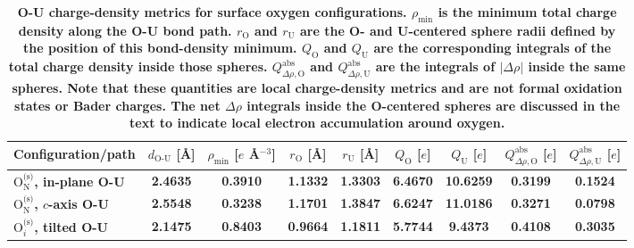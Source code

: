 \documentclass[preprint,12pt,sort&compress]{elsarticle}
\newcommand{\?}{\stackrel{?}{=}}
\providecommand{\DIFaddtex}[1]{{\bf #1}} %
\providecommand{\DIFaddFL}[1]{\DIFadd{#1}} %
\providecommand{\DIFadd}[1]{\texorpdfstring{\DIFaddtex{#1}}{#1}} %
\begin{document}
\begin{table}[h!]
\centering
\scriptsize
\caption{
\DIFaddFL{O-U charge-density metrics for surface oxygen configurations.
$\rho_\mathrm{min}$ is the minimum total charge density along the O-U bond path.
$r_\mathrm{O}$ and $r_\mathrm{U}$ are the O- and U-centered sphere radii defined by the position of this bond-density minimum.
$Q_\mathrm{O}$ and $Q_\mathrm{U}$ are the corresponding integrals of the total charge density inside those spheres.
$Q^\mathrm{abs}_{\Delta\rho,\mathrm{O}}$ and $Q^\mathrm{abs}_{\Delta\rho,\mathrm{U}}$ are the integrals of $|\Delta\rho|$ inside the same spheres.
Note that these quantities are local charge-density metrics and are not formal oxidation states or Bader charges.
The net $\Delta\rho$ integrals inside the O-centered spheres are discussed in the text to indicate local electron accumulation around oxygen.
}}
\begin{tabular}{lcccccccc}
\hline
\DIFaddFL{Configuration/path }&
\DIFaddFL{$d_{\text{O-U}}$ }[\DIFaddFL{\AA{}}] &
\DIFaddFL{$\rho_\mathrm{min}$ }[\DIFaddFL{$e$ \AA{}$^{-3}$}] &
\DIFaddFL{$r_\mathrm{O}$ }[\DIFaddFL{\AA{}}] &
\DIFaddFL{$r_\mathrm{U}$ }[\DIFaddFL{\AA{}}] &
\DIFaddFL{$Q_\mathrm{O}$ }[\DIFaddFL{$e$}] &
\DIFaddFL{$Q_\mathrm{U}$ }[\DIFaddFL{$e$}] &
\DIFaddFL{$Q^\mathrm{abs}_{\Delta\rho,\mathrm{O}}$ }[\DIFaddFL{$e$}] &
\DIFaddFL{$Q^\mathrm{abs}_{\Delta\rho,\mathrm{U}}$ }[\DIFaddFL{$e$}]
\\
\hline
\DIFaddFL{$\mathrm{O}_{\mathrm{N}}^{\text{(s)}}$, in-plane O-U }& \DIFaddFL{2.4635 }& \DIFaddFL{0.3910 }& \DIFaddFL{1.1332 }& \DIFaddFL{1.3303 }& \DIFaddFL{6.4670 }& \DIFaddFL{10.6259 }& \DIFaddFL{0.3199 }& \DIFaddFL{0.1524 }\\
\DIFaddFL{$\mathrm{O}_{\mathrm{N}}^{\text{(s)}}$, $c$-axis O-U }& \DIFaddFL{2.5548 }& \DIFaddFL{0.3238 }& \DIFaddFL{1.1701 }& \DIFaddFL{1.3847 }& \DIFaddFL{6.6247 }& \DIFaddFL{11.0186 }& \DIFaddFL{0.3271 }& \DIFaddFL{0.0798 }\\
\DIFaddFL{$\mathrm{O}_i^{\text{(s)}}$, tilted O-U }& \DIFaddFL{2.1475 }& \DIFaddFL{0.8403 }& \DIFaddFL{0.9664 }& \DIFaddFL{1.1811 }& \DIFaddFL{5.7744 }& \DIFaddFL{9.4373 }& \DIFaddFL{0.4108 }& \DIFaddFL{0.3035 }\\
\hline
\end{tabular}
\label{Tab:OU_charge_density_metrics}
\end{table}
\end{document}
